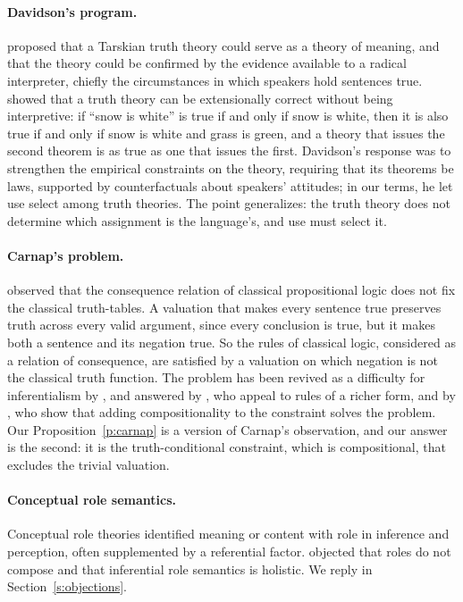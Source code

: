 \documentclass{situationist-preprint}
\begin{document}
\paragraph{Davidson's program.} \citet{Davidson1967} proposed that a Tarskian truth theory could serve as a theory of meaning, and \citet{Davidson1973} that the theory could be confirmed by the evidence available to a radical interpreter, chiefly the circumstances in which speakers hold sentences true. \citet{Foster1976} showed that a truth theory can be extensionally correct without being interpretive: if \enquote{snow is white} is true if and only if snow is white, then it is also true if and only if snow is white and grass is green, and a theory that issues the second theorem is as true as one that issues the first. Davidson's response was to strengthen the empirical constraints on the theory, requiring that its theorems be laws, supported by counterfactuals about speakers' attitudes; in our terms, he let use select among truth theories. The point generalizes: the truth theory does not determine which assignment is the language's, and use must select it.

\paragraph{Carnap's problem.} \citet{Carnap1943} observed that the consequence relation of classical propositional logic does not fix the classical truth-tables. A valuation that makes every sentence true preserves truth across every valid argument, since every conclusion is true, but it makes both a sentence and its negation true. So the rules of classical logic, considered as a relation of consequence, are satisfied by a valuation on which negation is not the classical truth function. The problem has been revived as a difficulty for inferentialism by \citet{Raatikainen2008}, and answered by \citet{MurziHjortland2009}, who appeal to rules of a richer form, and by \citet{BonnayWesterstahl2016}, who show that adding compositionality to the constraint solves the problem. Our Proposition~\ref{p:carnap} is a version of Carnap's observation, and our answer is the second: it is the truth-conditional constraint, which is compositional, that excludes the trivial valuation.

\paragraph{Conceptual role semantics.} Conceptual role theories \citep{Field1977,Harman1982,Block1986,Peacocke1992} identified meaning or content with role in inference and perception, often supplemented by a referential factor. \citet{FodorLepore1991,FodorLepore1992} objected that roles do not compose and that inferential role semantics is holistic. We reply in Section~\ref{s:objections}.
\end{document}
